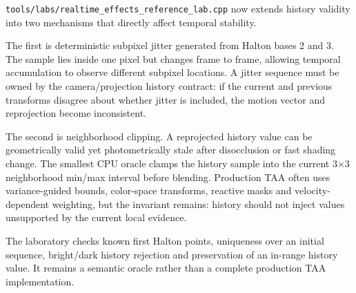 \texttt{tools/labs/realtime\_effects\_reference\_lab.cpp} now extends history validity into two mechanisms that directly affect temporal stability.

The first is deterministic subpixel jitter generated from Halton bases 2 and 3. The sample lies inside one pixel but changes frame to frame, allowing temporal accumulation to observe different subpixel locations. A jitter sequence must be owned by the camera/projection history contract: if the current and previous transforms disagree about whether jitter is included, the motion vector and reprojection become inconsistent.

The second is neighborhood clipping. A reprojected history value can be geometrically valid yet photometrically stale after disocclusion or fast shading change. The smallest CPU oracle clamps the history sample into the current 3×3 neighborhood min/max interval before blending. Production TAA often uses variance-guided bounds, color-space transforms, reactive masks and velocity-dependent weighting, but the invariant remains: history should not inject values unsupported by the current local evidence.

The laboratory checks known first Halton points, uniqueness over an initial sequence, bright/dark history rejection and preservation of an in-range history value. It remains a semantic oracle rather than a complete production TAA implementation.
